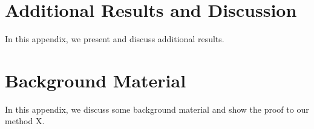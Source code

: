 \chapter{Additional Results and Discussion}

In this appendix, we present and discuss additional results.

\chapter{Background Material}

In this appendix, we discuss some background material and show the proof to our method X.
